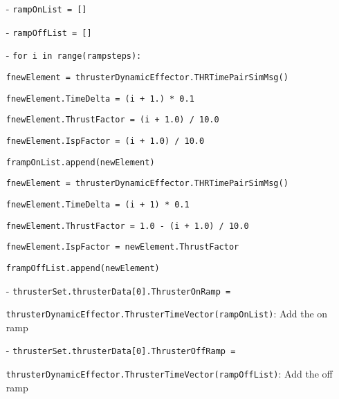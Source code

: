 \begin{itemize}
 \item[-]      \texttt{rampOnList = []}
 \item[-]      \texttt{rampOffList = []}

 \item[-]      \texttt{for i in range(rampsteps):}
 
\hspace{2cm}\texttt{fnewElement = thrusterDynamicEffector.THRTimePairSimMsg()}

\hspace{2cm}\texttt{fnewElement.TimeDelta = (i + 1.) * 0.1}

\hspace{2cm}\texttt{fnewElement.ThrustFactor = (i + 1.0) / 10.0}

\hspace{2cm}\texttt{fnewElement.IspFactor = (i + 1.0) / 10.0}

\hspace{2cm}\texttt{frampOnList.append(newElement)}

\hspace{2cm}\texttt{fnewElement = thrusterDynamicEffector.THRTimePairSimMsg()}

\hspace{2cm}\texttt{fnewElement.TimeDelta = (i + 1) * 0.1}

\hspace{2cm}\texttt{fnewElement.ThrustFactor = 1.0 - (i + 1.0) / 10.0}

 \hspace{2cm}\texttt{fnewElement.IspFactor = newElement.ThrustFactor}
 
 \hspace{2cm}\texttt{frampOffList.append(newElement)}

 \item[-]      \texttt{thrusterSet.thrusterData[0].ThrusterOnRamp =}
 
  \texttt{thrusterDynamicEffector.ThrusterTimeVector(rampOnList)}: Add the on ramp
 \item[-]      \texttt{thrusterSet.thrusterData[0].ThrusterOffRamp =}
 
 \texttt{thrusterDynamicEffector.ThrusterTimeVector(rampOffList)}: Add the off ramp
            
            \end{itemize}
